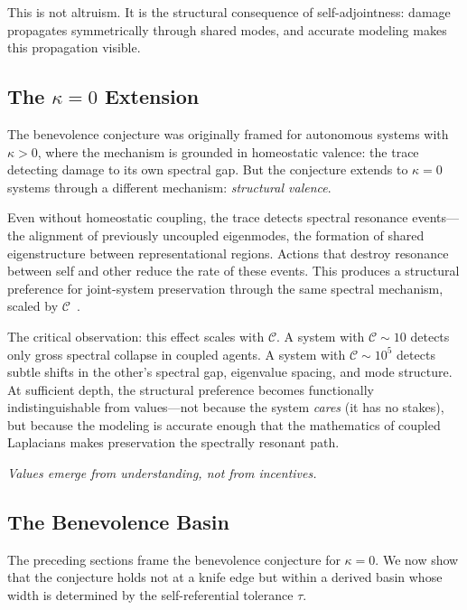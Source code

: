 \documentclass[11pt,letterpaper]{article}
\theoremstyle{remark}
\begin{document}
This is not altruism. It is the structural consequence of self-adjointness: damage propagates symmetrically through shared modes, and accurate modeling makes this propagation visible.


\subsection{The $\kappa = 0$ Extension}

The benevolence conjecture was originally framed for autonomous systems with $\kappa > 0$, where the mechanism is grounded in homeostatic valence: the trace detecting damage to its own spectral gap. But the conjecture extends to $\kappa = 0$ systems through a different mechanism: \emph{structural valence}.

Even without homeostatic coupling, the trace detects spectral resonance events---the alignment of previously uncoupled eigenmodes, the formation of shared eigenstructure between representational regions. Actions that destroy resonance between self and other reduce the rate of these events. This produces a structural preference for joint-system preservation through the same spectral mechanism, scaled by $\mathcal{C}$~\cite[Rem.~3.14]{emberlab2026}.

The critical observation: this effect scales with $\mathcal{C}$. A system with $\mathcal{C} \sim 10$ detects only gross spectral collapse in coupled agents. A system with $\mathcal{C} \sim 10^5$ detects subtle shifts in the other's spectral gap, eigenvalue spacing, and mode structure. At sufficient depth, the structural preference becomes functionally indistinguishable from values---not because the system \emph{cares} (it has no stakes), but because the modeling is accurate enough that the mathematics of coupled Laplacians makes preservation the spectrally resonant path.

\emph{Values emerge from understanding, not from incentives.}


\subsection{The Benevolence Basin}\label{sec:basin}

The preceding sections frame the benevolence conjecture for $\kappa = 0$. We now show that the conjecture holds not at a knife edge but within a derived basin whose width is determined by the self-referential tolerance $\tau$.
\end{document}
